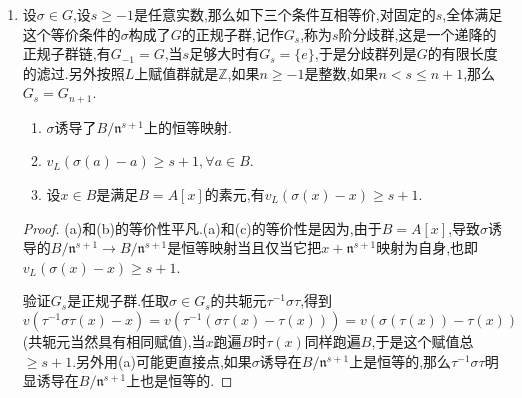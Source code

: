 \begin{enumerate}
\begin{proof}
		最后我们证明取本原元$\overline{x}$的极小多项式的一个提升$f$,那么存在本原元的提升$x$,使得$f(x)$是$B$的素元.一旦这件事得证,那么$x^i\Pi^j=x^if(x)^j$就是$x$的多项式,导致$B=A[x]$.先任取本原元的提升$x$,那么$f(x)$在$\mod\mathfrak{n}$下的像是零,导致$w(f(x))\ge1$.假设$w(f(x))\ge2$,任取$B$的素元$\Pi$,有$f(x+\Pi)=f(x)+f'(x)\Pi+\cdots$,没写出来的项是赋值$\ge2$的项,这里$f'(x)$是$B$中的单位,因为剩余类域扩张是可分的导致$\overline{f}(\overline{x})\not=0$,导致它是单位,于是$f'(x)\Pi$的赋值是1,所以从$w(x)\not=w(y)$时$w(x+y)=\min\{w(x),w(y)\}$得到$w(f(x+\Pi))=1$,而$x+\Pi$也是$\overline{x}$的提升.
	\end{proof}
	\item 设$\sigma\in G$,设$s\ge-1$是任意实数,那么如下三个条件互相等价,对固定的$s$,全体满足这个等价条件的$\sigma$构成了$G$的正规子群,记作$G_s$,称为$s$阶分歧群,这是一个递降的正规子群链,有$G_{-1}=G$,当$s$足够大时有$G_s=\{e\}$,于是分歧群列是$G$的有限长度的滤过.另外按照$L$上赋值群就是$\mathbb{Z}$,如果$n\ge-1$是整数,如果$n<s\le n+1$,那么$G_s=G_{n+1}$.
	\begin{enumerate}
		\item $\sigma$诱导了$B/\mathfrak{n}^{s+1}$上的恒等映射.
		\item $v_L(\sigma(a)-a)\ge s+1,\forall a\in B$.
		\item 设$x\in B$是满足$B=A[x]$的素元,有$v_L(\sigma(x)-x)\ge s+1$.
	\end{enumerate}
    \begin{proof}
    	
    	(a)和(b)的等价性平凡.(a)和(c)的等价性是因为,由于$B=A[x]$,导致$\sigma$诱导的$B/\mathfrak{n}^{s+1}\to B/\mathfrak{n}^{s+1}$是恒等映射当且仅当它把$x+\mathfrak{n}^{s+1}$映射为自身,也即$v_L(\sigma(x)-x)\ge s+1$.
    	
    	\qquad
    	
    	验证$G_s$是正规子群.任取$\sigma\in G_s$的共轭元$\tau^{-1}\sigma\tau$,得到$v(\tau^{-1}\sigma\tau(x)-x)=v(\tau^{-1}(\sigma\tau(x)-\tau(x)))=v(\sigma(\tau(x))-\tau(x))$(共轭元当然具有相同赋值),当$x$跑遍$B$时$\tau(x)$同样跑遍$B$,于是这个赋值总$\ge s+1$.另外用(a)可能更直接点,如果$\sigma$诱导在$B/\mathfrak{n}^{s+1}$上是恒等的,那么$\tau^{-1}\sigma\tau$明显诱导在$B/\mathfrak{n}^{s+1}$上也是恒等的.
    	
    	\qquad
    	

\end{proof}
\end{enumerate}
